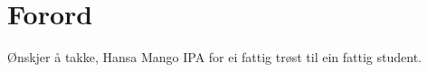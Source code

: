 \chapter*{Forord}
\thispagestyle{fancy}
Ønskjer å takke, Hansa Mango IPA for ei fattig trøst til ein fattig student.
